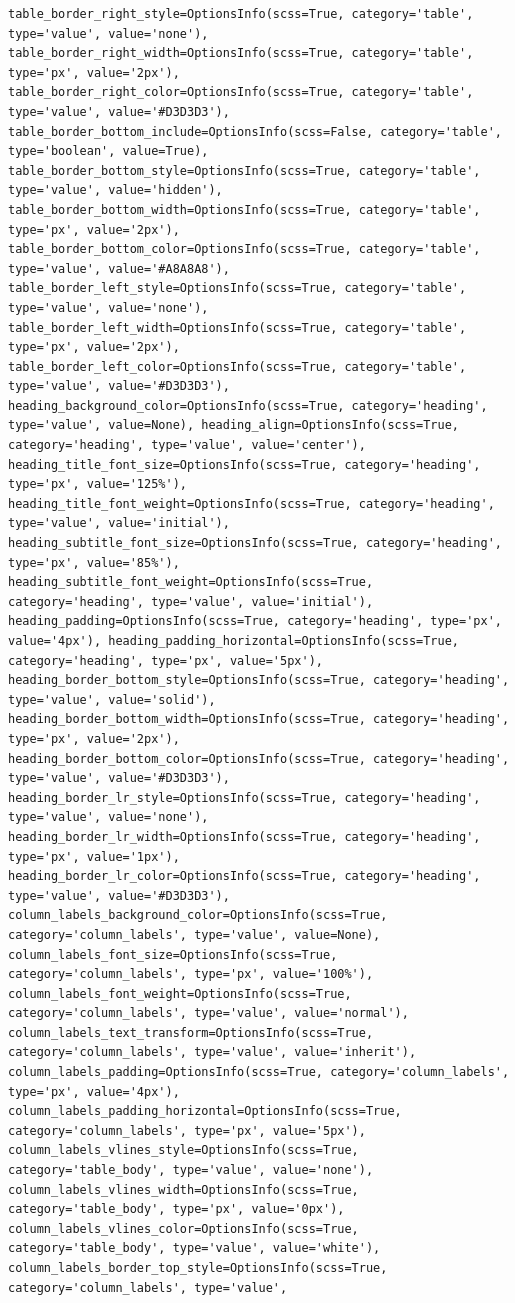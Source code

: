 \documentclass[
  letterpaper,
  DIV=11,
  numbers=noendperiod]{scrreprt}
\newcounter{none} %
\begin{document}
\begin{verbatim}
table_border_right_style=OptionsInfo(scss=True, category='table', type='value', value='none'), table_border_right_width=OptionsInfo(scss=True, category='table', type='px', value='2px'), table_border_right_color=OptionsInfo(scss=True, category='table', type='value', value='#D3D3D3'), table_border_bottom_include=OptionsInfo(scss=False, category='table', type='boolean', value=True), table_border_bottom_style=OptionsInfo(scss=True, category='table', type='value', value='hidden'), table_border_bottom_width=OptionsInfo(scss=True, category='table', type='px', value='2px'), table_border_bottom_color=OptionsInfo(scss=True, category='table', type='value', value='#A8A8A8'), table_border_left_style=OptionsInfo(scss=True, category='table', type='value', value='none'), table_border_left_width=OptionsInfo(scss=True, category='table', type='px', value='2px'), table_border_left_color=OptionsInfo(scss=True, category='table', type='value', value='#D3D3D3'), heading_background_color=OptionsInfo(scss=True, category='heading', type='value', value=None), heading_align=OptionsInfo(scss=True, category='heading', type='value', value='center'), heading_title_font_size=OptionsInfo(scss=True, category='heading', type='px', value='125%'), heading_title_font_weight=OptionsInfo(scss=True, category='heading', type='value', value='initial'), heading_subtitle_font_size=OptionsInfo(scss=True, category='heading', type='px', value='85%'), heading_subtitle_font_weight=OptionsInfo(scss=True, category='heading', type='value', value='initial'), heading_padding=OptionsInfo(scss=True, category='heading', type='px', value='4px'), heading_padding_horizontal=OptionsInfo(scss=True, category='heading', type='px', value='5px'), heading_border_bottom_style=OptionsInfo(scss=True, category='heading', type='value', value='solid'), heading_border_bottom_width=OptionsInfo(scss=True, category='heading', type='px', value='2px'), heading_border_bottom_color=OptionsInfo(scss=True, category='heading', type='value', value='#D3D3D3'), heading_border_lr_style=OptionsInfo(scss=True, category='heading', type='value', value='none'), heading_border_lr_width=OptionsInfo(scss=True, category='heading', type='px', value='1px'), heading_border_lr_color=OptionsInfo(scss=True, category='heading', type='value', value='#D3D3D3'), column_labels_background_color=OptionsInfo(scss=True, category='column_labels', type='value', value=None), column_labels_font_size=OptionsInfo(scss=True, category='column_labels', type='px', value='100%'), column_labels_font_weight=OptionsInfo(scss=True, category='column_labels', type='value', value='normal'), column_labels_text_transform=OptionsInfo(scss=True, category='column_labels', type='value', value='inherit'), column_labels_padding=OptionsInfo(scss=True, category='column_labels', type='px', value='4px'), column_labels_padding_horizontal=OptionsInfo(scss=True, category='column_labels', type='px', value='5px'), column_labels_vlines_style=OptionsInfo(scss=True, category='table_body', type='value', value='none'), column_labels_vlines_width=OptionsInfo(scss=True, category='table_body', type='px', value='0px'), column_labels_vlines_color=OptionsInfo(scss=True, category='table_body', type='value', value='white'), column_labels_border_top_style=OptionsInfo(scss=True, category='column_labels', type='value', 
\end{verbatim}
\end{document}

